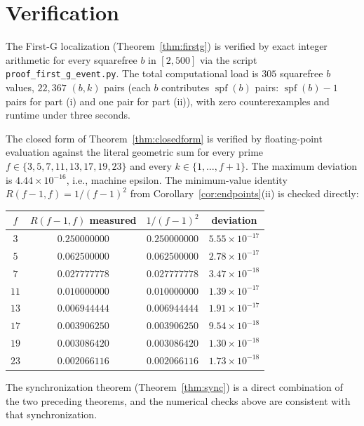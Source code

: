 \documentclass[11pt,reqno]{amsart}
\theoremstyle{plain}
\theoremstyle{definition}
\theoremstyle{remark}
\DeclareMathOperator{\spf}{spf}
\begin{document}
\section{Verification}\label{sec:verify}

The First-G localization (Theorem~\ref{thm:firstg}) is verified by
exact integer arithmetic for every squarefree $b$ in $[2,500]$ via
the script \texttt{proof\_first\_g\_event.py}. The total computational
load is $305$ squarefree $b$ values, $22{,}367$ $(b,k)$ pairs (each
$b$ contributes $\spf(b)$ pairs: $\spf(b)-1$ pairs for part (i) and
one pair for part (ii)), with zero counterexamples and runtime under
three seconds.

The closed form of Theorem~\ref{thm:closedform} is verified by
floating-point evaluation against the literal geometric sum for every
prime $f \in \{3,5,7,11,13,17,19,23\}$ and every $k \in
\{1,\dots,f+1\}$. The maximum deviation is $4.44 \times 10^{-16}$,
i.e., machine epsilon. The minimum-value identity $R(f-1,f) =
1/(f-1)^{2}$ from Corollary~\ref{cor:endpoints}(ii) is checked
directly:

\begin{center}
\begin{tabular}{c|c|c|c}
$f$ & $R(f-1,f)$ measured & $1/(f-1)^{2}$ & deviation\\
\hline
$3$ & $0.250000000$ & $0.250000000$ & $5.55\times 10^{-17}$\\
$5$ & $0.062500000$ & $0.062500000$ & $2.78\times 10^{-17}$\\
$7$ & $0.027777778$ & $0.027777778$ & $3.47\times 10^{-18}$\\
$11$ & $0.010000000$ & $0.010000000$ & $1.39\times 10^{-17}$\\
$13$ & $0.006944444$ & $0.006944444$ & $1.91\times 10^{-17}$\\
$17$ & $0.003906250$ & $0.003906250$ & $9.54\times 10^{-18}$\\
$19$ & $0.003086420$ & $0.003086420$ & $1.30\times 10^{-18}$\\
$23$ & $0.002066116$ & $0.002066116$ & $1.73\times 10^{-18}$\\
\end{tabular}
\end{center}

The synchronization theorem (Theorem~\ref{thm:sync}) is a direct
combination of the two preceding theorems, and the numerical checks
above are consistent with that synchronization.

\end{document}
